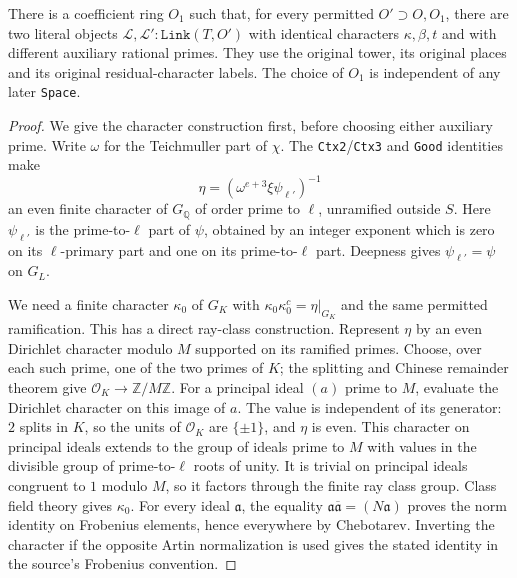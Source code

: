 \begin{proposition}
\label{claim:QX4}
There is a coefficient ring $O_1$ such that, for every permitted
$O'\supset O,O_1$, there are two literal objects
$\mathcal L,\mathcal L':\texttt{Link}(T,O')$ with identical
characters $\kappa,\beta,t$ and with different auxiliary
rational primes.  They use the original tower, its original
places and its original residual-character labels.  The choice
of $O_1$ is independent of any later \texttt{Space}.
\end{proposition}
\begin{proof}
We give the character construction first, before choosing either
auxiliary prime.  Write $\omega$ for the Teichmuller part of
$\chi$.  The \texttt{Ctx2}/\texttt{Ctx3} and \texttt{Good}
identities make
\[
       \eta=(\omega^{e+3}\xi\psi_{\ell'})^{-1}
       \tag{QX.9}
\]
an even finite character of $G_{\mathbb Q}$ of order prime to
$\ell$, unramified outside $S$.  Here $\psi_{\ell'}$ is the
prime-to-$\ell$ part of $\psi$, obtained by an integer exponent
which is zero on its $\ell$-primary part and one on its
prime-to-$\ell$ part.  Deepness gives
$\psi_{\ell'}=\psi$ on $G_L$.

We need a finite character $\kappa_0$ of $G_K$ with
$\kappa_0\kappa_0^c=\eta|_{G_K}$ and the same permitted
ramification.  This has a direct ray-class construction.
Represent $\eta$ by an even Dirichlet character modulo $M$
supported on its ramified primes.  Choose, over each such prime,
one of the two primes of $K$; the splitting and Chinese
remainder theorem give $\mathcal O_K\to\mathbb Z/M\mathbb Z$.
For a principal ideal $(a)$ prime to $M$, evaluate the
Dirichlet character on this image of $a$.  The value is
independent of its generator: $2$ splits in $K$, so the units
of $\mathcal O_K$ are $\{\pm1\}$, and $\eta$ is even.
This character on principal ideals extends to the group of
ideals prime to $M$ with values in the divisible group of
prime-to-$\ell$ roots of unity.  It is trivial on principal
ideals congruent to $1$ modulo $M$, so it factors through the
finite ray class group.  Class field theory gives $\kappa_0$.
For every ideal $\mathfrak a$, the equality
$\mathfrak a\overline{\mathfrak a}=(N\mathfrak a)$ proves the
norm identity on Frobenius elements, hence everywhere by
Chebotarev.  Inverting the character if the opposite Artin
normalization is used gives the stated identity in the source's
Frobenius convention.


\end{proof}
